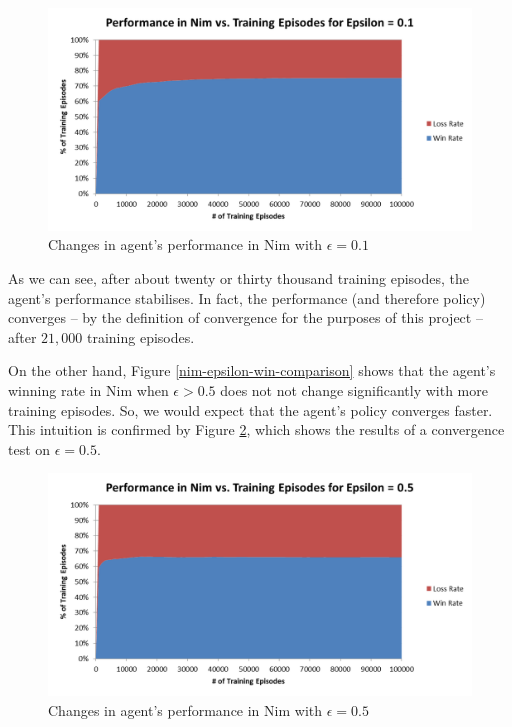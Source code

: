 \documentclass[11pt,a4paper]{report}
\begin{document}
\begin{figure}[htbp]
	\begin{center}
		\includegraphics[width=125mm]{Nim_PerformanceResults_0_1.png}
		\caption{Changes in agent's performance in Nim with $\epsilon = 0.1$}
		\label{nim-0-1-convergence}
	\end{center}
\end{figure}

As we can see, after about twenty or thirty thousand training episodes, the agent's performance stabilises. In fact, the performance (and therefore policy) converges -- by the definition of convergence for the purposes of this project -- after $21,000$ training episodes.

On the other hand, Figure \ref{nim-epsilon-win-comparison} shows that the agent's winning rate in Nim when $\epsilon > 0.5$ does not not change significantly with more training episodes. So, we would expect that the agent's policy converges faster. This intuition is confirmed by Figure \ref{nim-0-5-convergence}, which shows the results of a convergence test on $\epsilon = 0.5$.

\begin{figure}[htbp]
	\begin{center}
		\includegraphics[width=125mm]{Nim_PerformanceResults_0_5.png}
		\caption{Changes in agent's performance in Nim with $\epsilon = 0.5$}
		\label{nim-0-5-convergence}
	\end{center}
\end{figure}
\end{document}
